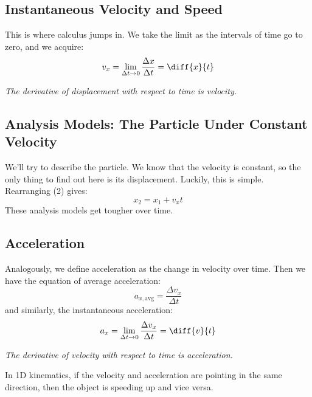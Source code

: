 \documentclass[12pt]{article}
\begin{document}
\subsection*{Instantaneous Velocity and Speed}
This is where calculus jumps in. We take the limit as the intervals of time go to zero, and we acquire:
\begin{equation}
    v_x = \lim_{\Delta t \rightarrow 0} \dfrac{\Delta x}{\Delta t} = \diff{x}{t}
\end{equation}
\begin{concept}
    \emph{The derivative of displacement with respect to time is velocity.}
\end{concept}
\subsection*{Analysis Models: The Particle Under Constant Velocity}
We'll try to describe the particle. We know that the velocity is constant, so the only thing to find out here is its displacement. Luckily, this is simple. Rearranging (2) gives:
\begin{equation}
    x_2 = x_1 + v_x t
\end{equation}
These analysis models get tougher over time.
\subsection*{Acceleration}
Analogously, we define acceleration as the change in velocity over time. Then we have the equation of average acceleration:
\begin{equation}
    a_{x, \text{avg}} = \dfrac{\Delta v_x}{\Delta t}
\end{equation}
and similarly, the instantaneous acceleration:
\begin{equation}
    a_x = \lim_{\Delta t\rightarrow 0} \dfrac{\Delta v_x}{\Delta t} = \diff{v}{t}
\end{equation}
\begin{concept}
    \emph{The derivative of velocity with respect to time is acceleration.}
\end{concept}
In 1D kinematics, if the velocity and acceleration are pointing in the same direction, then the object is speeding up and vice versa.
\end{document}
